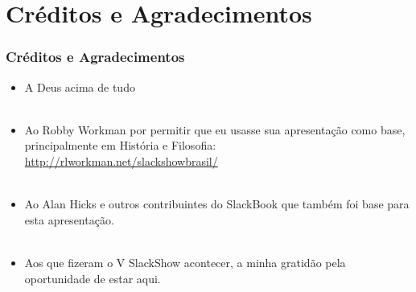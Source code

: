 \documentclass{beamer}
\begin{document}
\section{Créditos e Agradecimentos}

\begin{frame}
	\frametitle{Créditos e Agradecimentos}
	\begin{itemize}
		\item A Deus acima de tudo
		~\\
		~\\
		\item Ao Robby Workman por permitir que eu usasse sua
			apresentação como base, principalmente em História e Filosofia:
			\url{http://rlworkman.net/slackshowbrasil/}
		~\\
		~\\
		\item Ao Alan Hicks e outros contribuintes do SlackBook que também foi
			base para esta apresentação.
		~\\
		~\\
		\item Aos que fizeram o V SlackShow acontecer, a minha gratidão
			pela oportunidade de estar aqui.
	\end{itemize}
\end{frame}
\end{document}
